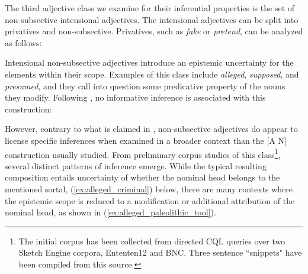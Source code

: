 \documentclass[10pt]{article}
\begin{document}
  The third adjective class we examine for their inferential properties is  the
set of 
non-subsective intensional adjectives. 
% 
% 
%
The intensional adjectives can be split into privatives and non-subsective. 
Privatives, such as {\it fake} or {\it pretend}, can be analyzed as follows:
\vspace{-0.5em}
\vspace{-0.5em}

\noindent
Intensional non-subsective adjectives introduce an epistemic uncertainty for the elements within their scope. 
Examples of  this class include \emph{alleged},
\emph{supposed}, and \emph{presumed}, and they call 
into question some predicative property of the nouns they modify. Following \cite{Kamp95prototypetheory}, no informative inference is associated with this construction:
\vspace{-1.0em}
\vspace{-0.5em}

\noindent However, contrary to what is claimed in \cite{amoia2006adjective}, non-subsective adjectives do appear to license specific inferences when examined in a broader context than the [A N] construction usually studied. From preliminary corpus studies of this class\footnote{The initial corpus has been collected from directed CQL queries over  two Sketch Engine corpora, Ententen12 and BNC. Three sentence ``snippets" have been compiled from this source.}, several distinct patterns of inference emerge. While the typical resulting composition entails  uncertainty of 
 whether the nominal head belongs to the mentioned sortal, (\ref{ex:alleged_criminal}) below, there are many contexts where the epistemic scope is reduced to  a modification or additional attribution of the nominal head, as shown in  (\ref{ex:alleged_paleolithic_tool}). 

\vspace{-0.5em}
\vspace{-0.5em}
\end{document}
